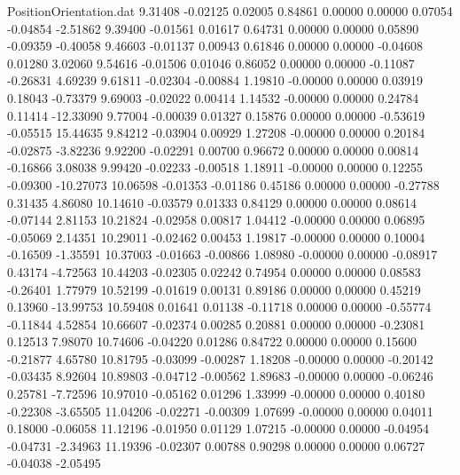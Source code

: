 \begin{filecontents}{PositionOrientation.dat}
   9.31408   -0.02125    0.02005     0.84861    0.00000    0.00000    0.07054   -0.04854   -2.51862
   9.39400   -0.01561    0.01617     0.64731    0.00000    0.00000    0.05890   -0.09359   -0.40058
   9.46603   -0.01137    0.00943     0.61846    0.00000    0.00000   -0.04608    0.01280    3.02060
   9.54616   -0.01506    0.01046     0.86052    0.00000    0.00000   -0.11087   -0.26831    4.69239
   9.61811   -0.02304   -0.00884     1.19810   -0.00000    0.00000    0.03919    0.18043   -0.73379
   9.69003   -0.02022    0.00414     1.14532   -0.00000    0.00000    0.24784    0.11414  -12.33090
   9.77004   -0.00039    0.01327     0.15876    0.00000    0.00000   -0.53619   -0.05515   15.44635
   9.84212   -0.03904    0.00929     1.27208   -0.00000    0.00000    0.20184   -0.02875   -3.82236
   9.92200   -0.02291    0.00700     0.96672    0.00000    0.00000    0.00814   -0.16866    3.08038
   9.99420   -0.02233   -0.00518     1.18911   -0.00000    0.00000    0.12255   -0.09300  -10.27073
  10.06598   -0.01353   -0.01186     0.45186    0.00000    0.00000   -0.27788    0.31435    4.86080
  10.14610   -0.03579    0.01333     0.84129    0.00000    0.00000    0.08614   -0.07144    2.81153
  10.21824   -0.02958    0.00817     1.04412   -0.00000    0.00000    0.06895   -0.05069    2.14351
  10.29011   -0.02462    0.00453     1.19817   -0.00000    0.00000    0.10004   -0.16509   -1.35591
  10.37003   -0.01663   -0.00866     1.08980   -0.00000    0.00000   -0.08917    0.43174   -4.72563
  10.44203   -0.02305    0.02242     0.74954    0.00000    0.00000    0.08583   -0.26401    1.77979
  10.52199   -0.01619    0.00131     0.89186    0.00000    0.00000    0.45219    0.13960  -13.99753
  10.59408    0.01641    0.01138    -0.11718    0.00000    0.00000   -0.55774   -0.11844    4.52854
  10.66607   -0.02374    0.00285     0.20881    0.00000    0.00000   -0.23081    0.12513    7.98070
  10.74606   -0.04220    0.01286     0.84722    0.00000    0.00000    0.15600   -0.21877    4.65780
  10.81795   -0.03099   -0.00287     1.18208   -0.00000    0.00000   -0.20142   -0.03435    8.92604
  10.89803   -0.04712   -0.00562     1.89683   -0.00000    0.00000   -0.06246    0.25781   -7.72596
  10.97010   -0.05162    0.01296     1.33999   -0.00000    0.00000    0.40180   -0.22308   -3.65505
  11.04206   -0.02271   -0.00309     1.07699   -0.00000    0.00000    0.04011    0.18000   -0.06058
  11.12196   -0.01950    0.01129     1.07215   -0.00000    0.00000   -0.04954   -0.04731   -2.34963
  11.19396   -0.02307    0.00788     0.90298    0.00000    0.00000    0.06727   -0.04038   -2.05495

\end{filecontents}
